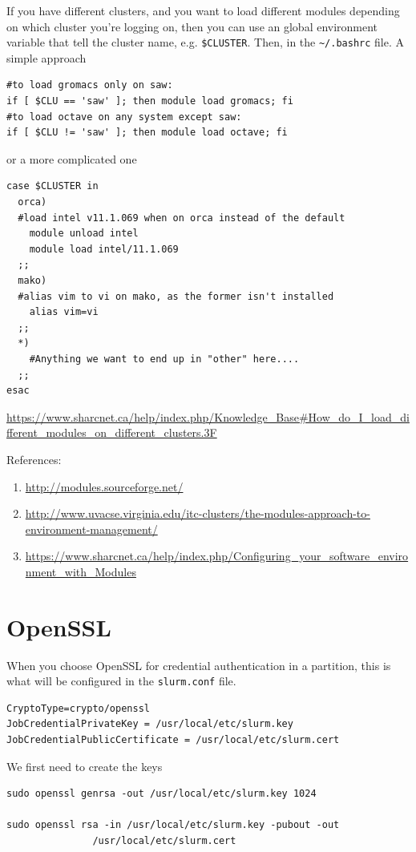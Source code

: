 If you have different clusters, and you want to load different modules depending
on which cluster you're logging on, then you can use an global environment
variable that tell the cluster name, e.g. \verb!$CLUSTER!. Then, in the
\verb!~/.bashrc! file. A simple approach
\begin{verbatim}
#to load gromacs only on saw: 
if [ $CLU == 'saw' ]; then module load gromacs; fi 
#to load octave on any system except saw: 
if [ $CLU != 'saw' ]; then module load octave; fi
\end{verbatim}

or a more complicated one
\begin{verbatim}
case $CLUSTER in
  orca)
  #load intel v11.1.069 when on orca instead of the default
  	module unload intel
  	module load intel/11.1.069 
  ;;
  mako)
  #alias vim to vi on mako, as the former isn't installed
    alias vim=vi
  ;;
  *)
    #Anything we want to end up in "other" here....
  ;;
esac
\end{verbatim}
\url{https://www.sharcnet.ca/help/index.php/Knowledge_Base\#How_do_I_load_different_modules_on_different_clusters.3F}


References:
\begin{enumerate}
  \item \url{http://modules.sourceforge.net/}
  
  \item
  \url{http://www.uvacse.virginia.edu/itc-clusters/the-modules-approach-to-environment-management/}
  
  \item
  \url{https://www.sharcnet.ca/help/index.php/Configuring_your_software_environment_with_Modules}
\end{enumerate}

\section{OpenSSL}
\label{sec:OpenSSL}

When you choose OpenSSL for credential authentication in a partition, this is
what will be configured in the \verb!slurm.conf! file.
\begin{verbatim}
CryptoType=crypto/openssl
JobCredentialPrivateKey = /usr/local/etc/slurm.key
JobCredentialPublicCertificate = /usr/local/etc/slurm.cert
\end{verbatim}

We first need to create the keys
\begin{verbatim}
sudo openssl genrsa -out /usr/local/etc/slurm.key 1024

sudo openssl rsa -in /usr/local/etc/slurm.key -pubout -out
               /usr/local/etc/slurm.cert
\end{verbatim}

